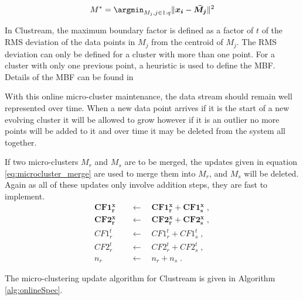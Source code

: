 \begin{equation}
  \label{eq:m*}
 M^{*} = \argmin_{M_j , j \in 1:q} \lVert {\boldsymbol{x_i} -\boldsymbol{\bar{M_j}} } \rVert ^2
\end{equation}

In Clustream, the maximum boundary factor is defined as a factor of $t$ of the RMS deviation of the data points in $M_j$ from the centroid of $M_j$. The RMS deviation can only be defined for a cluster with more than one point. For a cluster with only one previous point, a heuristic is used to define the MBF. Details of the MBF can be found in \cite{Aggarwal2003}%

With this online micro-cluster maintenance, the data stream should remain well represented over time. When a new data point arrives if it is the start of a new evolving cluster it will be allowed to grow however if it is an outlier no more points will be added to it and over time it may be deleted from the system all together.

If two micro-clusters $M_r$ and $M_s$ are to be merged, the updates given in equation \eqref{eq:microcluster_merge} are used to merge them into $M_r$, and $M_s$ will be deleted. Again as all of these updates only involve addition steps, they are fast to implement. 
\begin{align}
\boldsymbol{CF1^x_r} \quad &\leftarrow \quad \boldsymbol{CF1^x_r} + \boldsymbol{CF1^x_s} \; , \nonumber  \\ 
\boldsymbol{CF2^x_r} \quad &\leftarrow \quad \boldsymbol{CF2^x_r} + \boldsymbol{CF2^x_s} \; , \nonumber\\
CF1^t_r \quad &\leftarrow \quad  CF1^t_r + CF1^t_s\; , \nonumber   \\
CF2^t_r \quad &\leftarrow \quad CF2^t_r +  CF2^t_s\; , \nonumber\\
n_r  \quad &\leftarrow \quad n_r + n_s \; .
\label{eq:microcluster_merge}
\end{align}

The micro-clustering update algorithm for Clustream is given in Algorithm \ref{alg:onlineSpec}.

